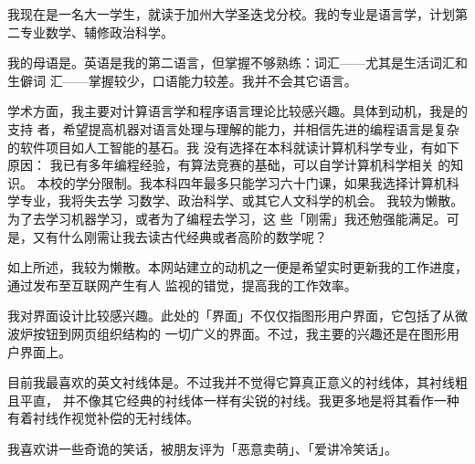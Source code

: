 我现在是一名大一学生，就读于加州大学圣迭戈分校。我的专业是语言学，计划第二专业数学、辅修政治科学。

我的母语是。英语是我的第二语言，但掌握不够熟练：词汇——尤其是生活词汇和生僻词
汇——掌握较少，口语能力较差。我并不会其它语言。


学术方面，我主要对计算语言学和程序语言理论比较感兴趣。具体到动机，我是的支持
者，希望提高机器对语言处理与理解的能力，并相信先进的编程语言是复杂的软件项目如人工智能的基石。我
没有选择在本科就读计算机科学专业，有如下原因：
\@ulist
  \@item 我已有多年编程经验，有算法竞赛的基础，可以自学计算机科学相关
    的知识。
  \@item 本校的学分限制。我本科四年最多只能学习六十门课，如果我选择计算机科学专业，我将失去学
    习数学、政治科学、或其它人文科学的机会。
  \@item 我较为懒散。为了去学习机器学习，或者为了编程去学习，这
    些「刚需」我还勉强能满足。可是，又有什么刚需让我去读古代经典或者高阶的数学呢？


如上所述，我较为懒散。本网站建立的动机之一便是希望实时更新我的工作进度，通过发布至互联网产生有人
监视的错觉，提高我的工作效率。

我对界面设计比较感兴趣。此处的「界面」不仅仅指图形用户界面，它包括了从微波炉按钮到网页组织结构的
一切广义的界面。不过，我主要的兴趣还是在图形用户界面上。

目前我最喜欢的英文衬线体是。不过我并不觉得它算真正意义的衬线体，其衬线粗且平直，
并不像其它经典的衬线体一样有尖锐的衬线。我更多地是将其看作一种有着衬线作视觉补偿的无衬线体。


我喜欢讲一些奇诡的笑话，被朋友评为「恶意卖萌」、「爱讲冷笑话」。
